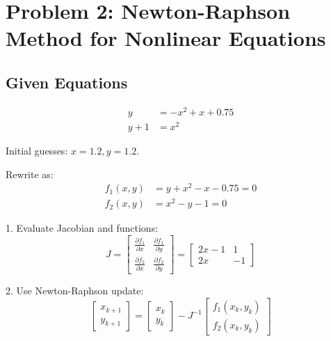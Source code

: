 \documentclass{article}
\begin{document}



\section*{Problem 2: Newton-Raphson Method for Nonlinear Equations}

\subsection*{Given Equations}
\begin{align*}
y &= -x^2 + x + 0.75 \\
y + 1 &= x^2
\end{align*}

Initial guesses: \( x = 1.2, y = 1.2 \).

Rewrite as:
\begin{align*}
f_1(x, y) &= y + x^2 - x - 0.75 = 0 \\
f_2(x, y) &= x^2 - y - 1 = 0
\end{align*}

1. Evaluate Jacobian and functions:
   \[
   J = \begin{bmatrix}
   \frac{\partial f_1}{\partial x} & \frac{\partial f_1}{\partial y} \\
   \frac{\partial f_2}{\partial x} & \frac{\partial f_2}{\partial y}
   \end{bmatrix}
   =
   \begin{bmatrix}
   2x - 1 & 1 \\
   2x & -1
   \end{bmatrix}
   \]

2. Use Newton-Raphson update:
   \[
   \begin{bmatrix} x_{k+1} \\ y_{k+1} \end{bmatrix} = \begin{bmatrix} x_k \\ y_k \end{bmatrix} - J^{-1} \begin{bmatrix} f_1(x_k, y_k) \\ f_2(x_k, y_k) \end{bmatrix}
   \]
\end{document}
